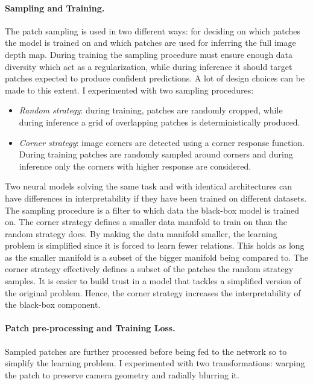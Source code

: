 \paragraph{Sampling and Training.}
The patch sampling is used in two different ways: for deciding on which patches the model is trained on and which patches are used for inferring the full image depth map. 
During training the sampling procedure must ensure enough data diversity which act as a regularization, while during inference it should target patches expected to produce confident predictions.
A lot of design choices can be made to this extent.
I experimented with two sampling procedures:
\begin{itemize}
    \item{\textit{Random strategy}: during training, patches are randomly cropped, while during inference a grid of overlapping patches is deterministically produced.}
    \item{\textit{Corner strategy}: image corners are detected using a corner response function. During training patches are randomly sampled around corners and during inference only the corners with higher response are considered.}
\end{itemize}
Two neural models solving the same task and with identical architectures can have differences in interpretability if they have been trained on different datasets.
The sampling procedure is a filter to which data the black-box model is trained on.
The corner strategy defines a smaller data manifold to train on than the random strategy does.
By making the data manifold smaller, the learning problem is simplified since it is forced to learn fewer relations.
This holds as long as the smaller manifold is a subset of the bigger manifold being compared to.
The corner strategy effectively defines a subset of the patches the random strategy samples.
It is easier to build trust in a model that tackles a simplified version of the original problem.
Hence, the corner strategy increases the interpretability of the black-box component. 

\paragraph{Patch pre-processing and Training Loss.}
Sampled patches are further processed before being fed to the network so to simplify the learning problem.
I experimented with two transformations: warping the patch to preserve camera geometry and radially blurring it.

